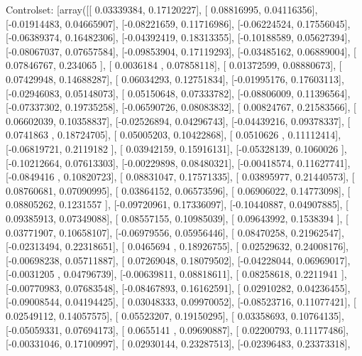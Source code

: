 \documentclass{article}
\begin{document}
Controlset: [array([[ 0.03339384,  0.17120227],
       [ 0.08816995,  0.04116356],
       [-0.01914483,  0.04665907],
       [-0.08221659,  0.11716986],
       [-0.06224524,  0.17556045],
       [-0.06389374,  0.16482306],
       [-0.04392419,  0.18313355],
       [-0.10188589,  0.05627394],
       [-0.08067037,  0.07657584],
       [-0.09853904,  0.17119293],
       [-0.03485162,  0.06889004],
       [ 0.07846767,  0.234065  ],
       [ 0.0036184 ,  0.07858118],
       [ 0.01372599,  0.08880673],
       [ 0.07429948,  0.14688287],
       [ 0.06034293,  0.12751834],
       [-0.01995176,  0.17603113],
       [-0.02946083,  0.05148073],
       [ 0.05150648,  0.07333782],
       [-0.08806009,  0.11396564],
       [-0.07337302,  0.19735258],
       [-0.06590726,  0.08083832],
       [ 0.00824767,  0.21583566],
       [ 0.06602039,  0.10358837],
       [-0.02526894,  0.04296743],
       [-0.04439216,  0.09378337],
       [ 0.0741863 ,  0.18724705],
       [ 0.05005203,  0.10422868],
       [ 0.0510626 ,  0.11112414],
       [-0.06819721,  0.2119182 ],
       [ 0.03942159,  0.15916131],
       [-0.05328139,  0.1060026 ],
       [-0.10212664,  0.07613303],
       [-0.00229898,  0.08480321],
       [-0.00418574,  0.11627741],
       [-0.0849416 ,  0.10820723],
       [ 0.08831047,  0.17571335],
       [ 0.03895977,  0.21440573],
       [ 0.08760681,  0.07090995],
       [ 0.03864152,  0.06573596],
       [ 0.06906022,  0.14773098],
       [ 0.08805262,  0.1231557 ],
       [-0.09720961,  0.17336097],
       [-0.10440887,  0.04907885],
       [ 0.09385913,  0.07349088],
       [ 0.08557155,  0.10985039],
       [ 0.09643992,  0.1538394 ],
       [ 0.03771907,  0.10658107],
       [-0.06979556,  0.05956446],
       [ 0.08470258,  0.21962547],
       [-0.02313494,  0.22318651],
       [ 0.0465694 ,  0.18926755],
       [ 0.02529632,  0.24008176],
       [-0.00698238,  0.05711887],
       [ 0.07269048,  0.18079502],
       [-0.04228044,  0.06969017],
       [-0.0031205 ,  0.04796739],
       [-0.00639811,  0.08818611],
       [ 0.08258618,  0.2211941 ],
       [-0.00770983,  0.07683548],
       [-0.08467893,  0.16162591],
       [ 0.02910282,  0.04236455],
       [-0.09008544,  0.04194425],
       [ 0.03048333,  0.09970052],
       [-0.08523716,  0.11077421],
       [ 0.02549112,  0.14057575],
       [ 0.05523207,  0.19150295],
       [ 0.03358693,  0.10764135],
       [-0.05059331,  0.07694173],
       [ 0.0655141 ,  0.09690887],
       [ 0.02200793,  0.11177486],
       [-0.00331046,  0.17100997],
       [ 0.02930144,  0.23287513],
       [-0.02396483,  0.23373318],
\end{document}
